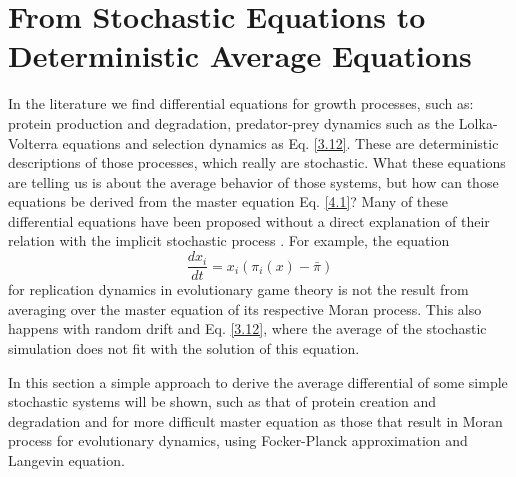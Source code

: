 \chapter{From Stochastic Equations to Deterministic Average Equations}
\ifpdf
    \graphicspath{{FromStochastic/Figs/PNG/}{FromStochastic/Figs/PDF/}{Fromstochastic/Figs/}}
\else
    \graphicspath{{FromStochastic/Figs/EPS/}{FromStochastic/Figs/}}
\fi
In the literature we find differential equations for growth  processes, such as: protein production and degradation, predator-prey dynamics such as the Lolka-Volterra equations and selection dynamics as Eq. \eqref{3.12}. These are deterministic descriptions of those processes, which really are stochastic. What these equations are telling us is about the average behavior of those systems, but how can those equations be derived from the master equation Eq. \eqref{4.1}? Many of these differential equations have been proposed without a direct explanation of their relation with the implicit stochastic process \cite{Traulsen2005a}. For example, the equation 
\begin{equation}\label{6.1}
\frac{dx_i}{dt}=x_i(\pi_i(x) - \bar\pi)
\end{equation}  
for replication dynamics in evolutionary game theory is not the result from averaging over the master equation of its respective Moran process. This also happens with random drift and Eq. \eqref{3.12}, where the average of the stochastic simulation does not fit with the solution of this equation.  

In this section  a simple approach to derive the average differential of some simple stochastic systems will be shown, such as that of protein creation and degradation and for more difficult master equation as those that result in Moran process for evolutionary dynamics, using Focker-Planck approximation and Langevin equation.
